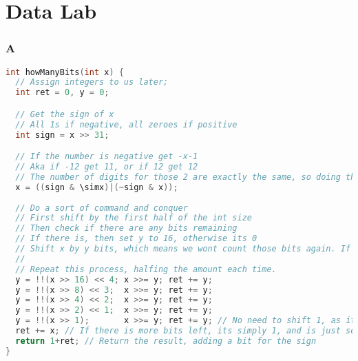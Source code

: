 \documentclass[11pt]{report}
\begin{document}

\tableofcontents
\newpage

\chapter{Data Lab}
\subsection{A}
\begin{lstlisting}[language=C]
int howManyBits(int x) {
  // Assign integers to us later;
  int ret = 0, y = 0;

  // Get the sign of x
  // All 1s if negative, all zeroes if positive
  int sign = x >> 31;

  // If the number is negative get -x-1 
  // Aka if -12 get 11, or if 12 get 12
  // The number of digits for those 2 are exactly the same, so doing this just makes it significantly easier to work with
  x = ((sign & \simx)|(~sign & x));
 
  // Do a sort of command and conquer
  // First shift by the first half of the int size
  // Then check if there are any bits remaining
  // If there is, then set y to 16, otherwise its 0
  // Shift x by y bits, which means we wont count those bits again. If there was less than 16 bits, nothing happens.
  //  
  // Repeat this process, halfing the amount each time. 
  y = !!(x >> 16) << 4; x >>= y; ret += y;
  y = !!(x >> 8) << 3;  x >>= y; ret += y;
  y = !!(x >> 4) << 2;  x >>= y; ret += y;
  y = !!(x >> 2) << 1;  x >>= y; ret += y;
  y = !!(x >> 1);       x >>= y; ret += y; // No need to shift 1, as it would be by 0
  ret += x; // If there is more bits left, its simply 1, and is just set to x
  return 1+ret; // Return the result, adding a bit for the sign
}
\end{lstlisting}
\end{document}
